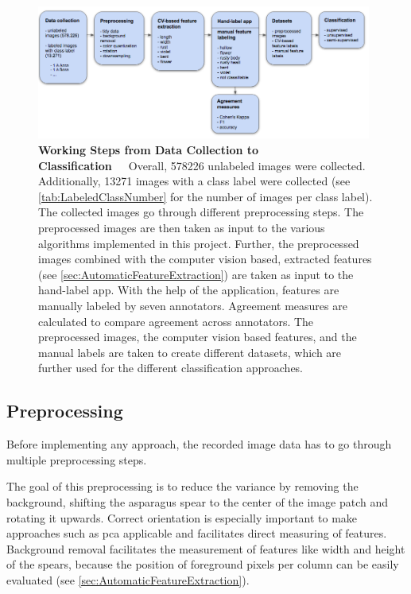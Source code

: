 \begin{figure}[!hb]
    \centering
    \includegraphics[width=0.98\textwidth]{Figures/chapter03/working_steps.png}
    \decoRule
    \caption[Working Steps from Data Collection to Classification]{\textbf{Working Steps from Data Collection to Classification}~~~Overall, 578226 unlabeled images were collected. Additionally, 13271 images with a class label were collected (see \autoref{tab:LabeledClassNumber} for the number of images per class label). The collected images go through different preprocessing steps. The preprocessed images are then taken as input to the various algorithms implemented in this project. Further, the preprocessed images combined with the computer vision based, extracted features (see \autoref{sec:AutomaticFeatureExtraction}) are taken as input to the hand-label app. With the help of the application, features are manually labeled by seven annotators. Agreement measures are calculated to compare agreement across annotators. The preprocessed images, the computer vision based features, and the manual labels are taken to create different datasets, which are further used for the different classification approaches.}
    \label{fig:WorkingSteps}
\end{figure}


\subsection{Preprocessing}
\label{sec:Preprocessing}

Before implementing any approach, the recorded image data has to go through multiple preprocessing steps.

The goal of this preprocessing is to reduce the variance by removing the background, shifting the asparagus spear to the center of the image patch and rotating it upwards. Correct orientation is especially important to make approaches such as \acrshort{pca} applicable and facilitates direct measuring of features. Background removal facilitates the measurement of features like width and height of the spears, because the position of foreground pixels per column can be easily evaluated (see \autoref{sec:AutomaticFeatureExtraction}).

